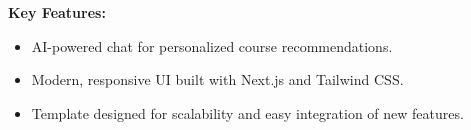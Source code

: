 \documentclass[11pt,a4paper]{article}
\begin{document}
\begin{adjustwidth}{2em}{}
\begin{multicols}{2}
\textbf{Key Features:}
\begin{itemize}[leftmargin=*]
    \item AI-powered chat for personalized course recommendations.
    \item Modern, responsive UI built with Next.js and Tailwind CSS.
    \item Template designed for scalability and easy integration of new features.
\end{itemize}

\end{multicols}
\end{adjustwidth}
\end{document}
